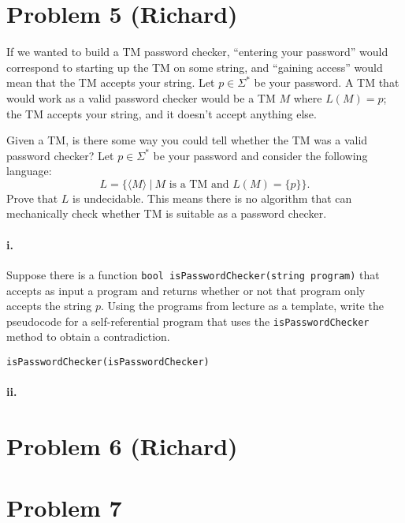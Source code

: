 \documentclass[10pt,letter]{article}
\begin{document}
\section*{Problem 5 (Richard)}
If we wanted to build a TM password checker, “entering your password” would correspond to starting up the TM on some string, and “gaining access” would mean that the TM accepts your string. Let $p \in \Sigma^*$ be your password. A TM that would work as a valid password checker would be a TM $M$ where $L(M) = {p}$; the TM accepts your string, and it doesn't accept anything else.

Given a TM, is there some way you could tell whether the TM was a valid password checker? Let $p \in \Sigma^*$ be your password and consider the following language: $$ L = \{ \langle M \rangle \ | \ M \text{ is a TM and } L(M) = \{p\}\}.$$ Prove that $L$ is undecidable. This means there is no algorithm that can mechanically check whether TM is suitable as a password checker.

\paragraph{i.} Suppose there is a function \texttt{bool isPasswordChecker(string program)} that accepts as input a program and returns whether or not that program only accepts the string $p$. Using the programs from lecture as a template, write the pseudocode for a self-referential program that uses the \texttt{isPasswordChecker} method to obtain a contradiction. 

\texttt{isPasswordChecker(isPasswordChecker)}

\paragraph{ii.} 

\section*{Problem 6 (Richard)}

\section*{Problem 7}
\end{document}
